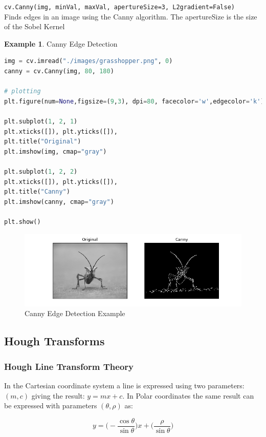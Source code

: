 \documentclass{article}
\theoremstyle{definition}
\newtheorem{ex}{Example}[subsection]
\theoremstyle{remark}
\newcommand{\func}[2]{\noindent\lstinline{#1}\\#2}
\begin{document}
\func{cv.Canny(img, minVal, maxVal, apertureSize=3, L2gradient=False)}{
Finds edges in an image using the Canny algorithm. The apertureSize is the size of the Sobel Kernel
}

\begin{ex} Canny Edge Detection
\begin{lstlisting}[language=Python]
img = cv.imread("./images/grasshopper.png", 0)
canny = cv.Canny(img, 80, 180)

# plotting
plt.figure(num=None,figsize=(9,3), dpi=80, facecolor='w',edgecolor='k')

plt.subplot(1, 2, 1)
plt.xticks([]), plt.yticks([]), 
plt.title("Original")
plt.imshow(img, cmap="gray") 

plt.subplot(1, 2, 2)
plt.xticks([]), plt.yticks([]), 
plt.title("Canny")
plt.imshow(canny, cmap="gray")

plt.show()
\end{lstlisting}
\begin{figure}[h!]
    \centering
    \includegraphics[width=\textwidth]{ocv_canny}
    \caption{Canny Edge Detection Example}
    \label{fig:ocv_canny}
\end{figure}
\end{ex}



\break

\subsection{Hough Transforms}

\subsubsection{Hough Line Transform Theory}

In the Cartesian coordinate system a line is expressed using two parameters: $ (m , c) $ giving the result: $ y = mx + c $. In Polar coordinates the same result can be expressed with parameters $ (\theta, \rho) $ as:

\begin{equation}
    y = \bigg(-\frac{\cos\theta}{\sin\theta}\bigg)x + \bigg(\frac{\rho}{\sin\theta}\bigg)
\end{equation}
\end{document}
